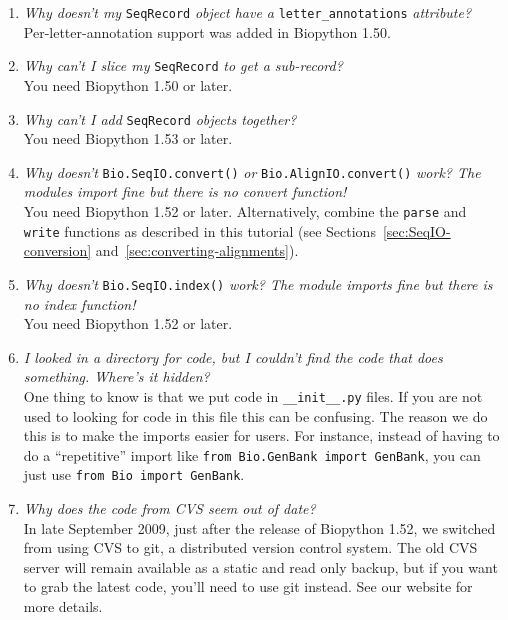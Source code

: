 \documentclass{report}
\begin{document}
\begin{enumerate}
  \item \emph{Why doesn't my} \verb|SeqRecord| \emph{object have a} \verb|letter_annotations| \emph{attribute?} \\
  Per-letter-annotation support was added in Biopython 1.50.
  
 \item \emph{Why can't I slice my} \verb|SeqRecord| \emph{to get a sub-record?} \\
  You need Biopython 1.50 or later.

 \item \emph{Why can't I add} \verb|SeqRecord| \emph{objects together?} \\
  You need Biopython 1.53 or later.

  \item \emph{Why doesn't} \verb|Bio.SeqIO.convert()| \emph{or} \verb|Bio.AlignIO.convert()| \emph{work? The modules import fine but there is no convert function!} \\
  You need Biopython 1.52 or later. Alternatively, combine the \verb|parse| and \verb|write|
  functions as described in this tutorial (see Sections~\ref{sec:SeqIO-conversion} and~\ref{sec:converting-alignments}).

 \item \emph{Why doesn't} \verb|Bio.SeqIO.index()| \emph{work? The module imports fine but there is no index function!} \\
  You need Biopython 1.52 or later.
  
  \item \emph{I looked in a directory for code, but I couldn't find the code that does something. Where's it hidden?} \\
  One thing to know is that we put code in \verb|__init__.py| files. If you are not used to looking for code in this file this can be confusing. The reason we do this is to make the imports easier for users. For instance, instead of having to do a ``repetitive'' import like \verb|from Bio.GenBank import GenBank|, you can just use \verb|from Bio import GenBank|.

 \item \emph{Why does the code from CVS seem out of date?} \\
  In late September 2009, just after the release of Biopython 1.52, we switched from using CVS to git, a distributed version control system. The old CVS server will remain available as a static and read only backup, but if you want to grab the latest code, you'll need to use git instead. See our website for more details.
\end{enumerate}
\end{document}
